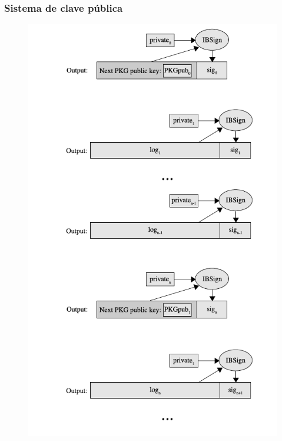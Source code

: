 \documentclass[10pt, a4paper,english,spanish]{beamer}
\begin{document}
\begin{frame}
\frametitle{Sistema de clave pública}
\begin{figure}
  \includegraphics[scale=0.4]{imagenes/PKG.png}
\end{figure}
\end{frame}
\end{document}
